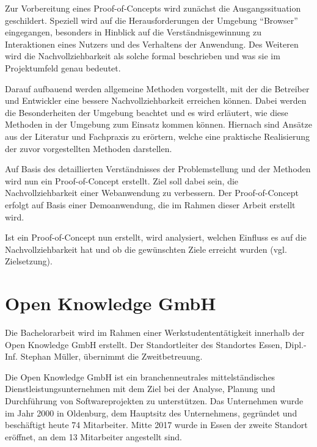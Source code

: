 \vspace{-0.5\baselineskip}

Zur Vorbereitung eines Proof-of-Concepts wird zunächst die Ausgangssituation geschildert. Speziell wird auf die Herausforderungen der Umgebung \enquote{Browser} eingegangen, besonders in Hinblick auf die Verständnisgewinnung zu Interaktionen eines Nutzers und des Verhaltens der Anwendung. Des Weiteren wird die Nachvollziehbarkeit als solche formal beschrieben und was sie im Projektumfeld genau bedeutet.

Darauf aufbauend werden allgemeine Methoden vorgestellt, mit der die Betreiber und Entwickler eine bessere Nachvollziehbarkeit erreichen können. Dabei werden die Besonderheiten der Umgebung beachtet und es wird erläutert, wie diese Methoden in der Umgebung zum Einsatz kommen können. Hiernach sind Ansätze aus der Literatur und Fachpraxis zu erörtern, welche eine praktische Realisierung der zuvor vorgestellten Methoden darstellen.

Auf Basis des detaillierten Verständnisses der Problemstellung und der Methoden wird nun ein Proof-of-Concept erstellt. Ziel soll dabei sein, die Nachvollziehbarkeit einer Webanwendung zu verbessern. Der Proof-of-Concept erfolgt auf Basis einer Demoanwendung, die im Rahmen dieser Arbeit erstellt wird.

Ist ein Proof-of-Concept nun erstellt, wird analysiert, welchen Einfluss es auf die Nachvollziehbarkeit hat und ob die gewünschten Ziele erreicht wurden (vgl. Zielsetzung).

\vspace{-0.5\baselineskip}

\section{Open Knowledge GmbH}

\vspace{-0.5\baselineskip}

Die Bachelorarbeit wird im Rahmen einer Werkstudententätigkeit innerhalb der Open Knowledge GmbH erstellt. Der Standortleiter des Standortes Essen, Dipl.-Inf. Stephan Müller, übernimmt die Zweitbetreuung.

Die Open Knowledge GmbH ist ein branchenneutrales mittelständisches Dienstleistungsunternehmen mit dem Ziel bei der Analyse, Planung und Durchführung von Softwareprojekten zu unterstützen. Das Unternehmen wurde im Jahr 2000 in Oldenburg, dem Hauptsitz des Unternehmens, gegründet und beschäftigt heute 74 Mitarbeiter. Mitte 2017 wurde in Essen der zweite Standort eröffnet, an dem 13 Mitarbeiter angestellt sind.

